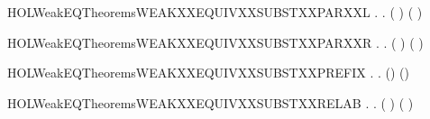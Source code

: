 \begin{SaveVerbatim}{HOLWeakEQTheoremsWEAKXXEQUIVXXSUBSTXXPARXXL}
\HOLTokenTurnstile{} \HOLSymConst{\HOLTokenForall{}} .
          \HOLSymConst{\HOLTokenImp{}} \HOLSymConst{\HOLTokenForall{}}.  ( \HOLSymConst{\ensuremath{\parallel}} ) ( \HOLSymConst{\ensuremath{\parallel}} )
\end{SaveVerbatim}
\newcommand{\HOLWeakEQTheoremsWEAKXXEQUIVXXSUBSTXXPARXXL}{\UseVerbatim{HOLWeakEQTheoremsWEAKXXEQUIVXXSUBSTXXPARXXL}}
\begin{SaveVerbatim}{HOLWeakEQTheoremsWEAKXXEQUIVXXSUBSTXXPARXXR}
\HOLTokenTurnstile{} \HOLSymConst{\HOLTokenForall{}} .
          \HOLSymConst{\HOLTokenImp{}} \HOLSymConst{\HOLTokenForall{}}.  ( \HOLSymConst{\ensuremath{\parallel}} ) ( \HOLSymConst{\ensuremath{\parallel}} )
\end{SaveVerbatim}
\newcommand{\HOLWeakEQTheoremsWEAKXXEQUIVXXSUBSTXXPARXXR}{\UseVerbatim{HOLWeakEQTheoremsWEAKXXEQUIVXXSUBSTXXPARXXR}}
\begin{SaveVerbatim}{HOLWeakEQTheoremsWEAKXXEQUIVXXSUBSTXXPREFIX}
\HOLTokenTurnstile{} \HOLSymConst{\HOLTokenForall{}} .    \HOLSymConst{\HOLTokenImp{}} \HOLSymConst{\HOLTokenForall{}}.  () ()
\end{SaveVerbatim}
\newcommand{\HOLWeakEQTheoremsWEAKXXEQUIVXXSUBSTXXPREFIX}{\UseVerbatim{HOLWeakEQTheoremsWEAKXXEQUIVXXSUBSTXXPREFIX}}
\begin{SaveVerbatim}{HOLWeakEQTheoremsWEAKXXEQUIVXXSUBSTXXRELAB}
\HOLTokenTurnstile{} \HOLSymConst{\HOLTokenForall{}} .
          \HOLSymConst{\HOLTokenImp{}}
       \HOLSymConst{\HOLTokenForall{}}.  (  ) (  )
\end{SaveVerbatim}

